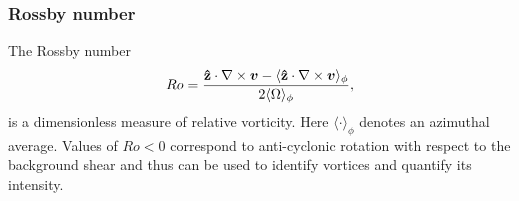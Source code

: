 \subsubsection{Rossby number}
The Rossby number
\begin{align}
  Ro = \frac{{\bf \hat{z}} \cdot \nabla \times \bm{v} - \langle
    {\bf\hat{z}} \cdot \nabla \times \bm{v}
    \rangle_{\phi}}{2\langle\Omega\rangle_{\phi}},  
\end{align}
is a dimensionless measure of relative vorticity. 
Here $\langle \cdot \rangle_{\phi}$ denotes an azimuthal
average. Values of $Ro<0$ correspond to anti-cyclonic rotation with
respect to the background shear and thus can be used to identify
vortices and quantify its intensity. 
